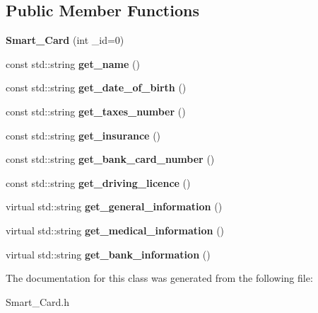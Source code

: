\subsection*{Public Member Functions}
\begin{DoxyCompactItemize}
\item 
\mbox{\label{classSmart__Card_a4f4fe2f699499066a4d4dfac2b4a1d8d}} 
{\bfseries Smart\+\_\+\+Card} (int \+\_\+id=0)
\item 
\mbox{\label{classSmart__Card_a05e1d5bc72008ee610e7f41ca33ce1f6}} 
const std\+::string {\bfseries get\+\_\+name} ()
\item 
\mbox{\label{classSmart__Card_a595d127eba331f581be4123d875f5d66}} 
const std\+::string {\bfseries get\+\_\+date\+\_\+of\+\_\+birth} ()
\item 
\mbox{\label{classSmart__Card_aaf70c68d37bfbe00d46ccc88ca19892c}} 
const std\+::string {\bfseries get\+\_\+taxes\+\_\+number} ()
\item 
\mbox{\label{classSmart__Card_a784debae8edda24f37544f7194b04fcc}} 
const std\+::string {\bfseries get\+\_\+insurance} ()
\item 
\mbox{\label{classSmart__Card_a7fd85140ca3d67319e91023367db018e}} 
const std\+::string {\bfseries get\+\_\+bank\+\_\+card\+\_\+number} ()
\item 
\mbox{\label{classSmart__Card_a820d631da800e09e3990829c3dd30a2b}} 
const std\+::string {\bfseries get\+\_\+driving\+\_\+licence} ()
\item 
\mbox{\label{classSmart__Card_a4e5bbbf29e25e9657940f4091f3e1ba0}} 
virtual std\+::string {\bfseries get\+\_\+general\+\_\+information} ()
\item 
\mbox{\label{classSmart__Card_a9dfaf07cce3ea7ae2d5d159d60727fed}} 
virtual std\+::string {\bfseries get\+\_\+medical\+\_\+information} ()
\item 
\mbox{\label{classSmart__Card_a1a13e7a3363ca29311b46c7112ef3982}} 
virtual std\+::string {\bfseries get\+\_\+bank\+\_\+information} ()
\end{DoxyCompactItemize}


The documentation for this class was generated from the following file\+:\begin{DoxyCompactItemize}
\item 
Smart\+\_\+\+Card.\+h\end{DoxyCompactItemize}
